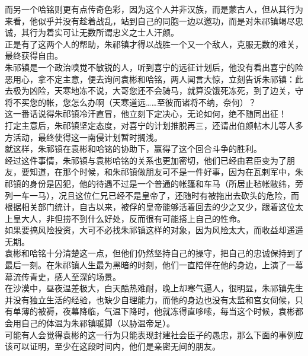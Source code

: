 \begin{multicols}{\theparacolNo}
而另一个哈铭则更有点传奇色彩，因为这个人并非汉族，而是蒙古人，但从其行为来看，他似乎并没有趁着战乱，站到自己的同胞一边以邀功，而是对朱祁镇竭尽忠诚，其行为着实可让无数所谓忠义之士人汗颜。\\

正是有了这两个人的帮助，朱祁镇才得以战胜一个又一个敌人，克服无数的难关，最终获得自由。\\

朱祁镇是一个政治嗅觉不敏锐的人，听到喜宁的远征计划后，他没有看出喜宁的险恶用心，拿不定主意，便去询问袁彬和哈铭，两人闻言大惊，立刻告诉朱祁镇：此去极为凶险，天寒地冻不说，大哥您还不会骑马，就算没饿死冻死，到了边关，守将不买您的帐，您怎么办啊（天寒道远……至彼而诸将不纳，奈何）？\\

这一番话说得朱祁镇冷汗直冒，他立刻下定决心，无论如何，绝不随同出征！\\

打定主意后，朱祁镇坚定态度，对喜宁的计划推脱再三，还请出伯颜帖木儿等人多方活动，最终使得这一南侵计划暂时搁浅。\\

就这样，朱祁镇在袁彬和哈铭的协助下，赢得了这个回合斗争的胜利。\\

经过这件事情，朱祁镇与袁彬哈铭的关系也更加密切，他们已经由君臣变为了朋友，要知道，在那个时候，和朱祁镇做朋友可不是一件好事，因为在瓦剌军中，朱祁镇的身份是囚犯，他的待遇不过是一个普通的帐篷和车马（所居止毡帐敝纬，旁列一车一马），况且这位仁兄已经不是皇帝了，还随时有被拖出去砍头的危险，而根据相关部门统计，自古以来，被俘的皇帝能够活着回去的少之又少，跟着这位太上皇大人，非但捞不到什么好处，反而很有可能搭上自己的性命。\\

如果要搞风险投资，大可不必找朱祁镇这样的对象，因为风险太大，而收益却遥遥无期。\\

袁彬和哈铭十分清楚这一点，但他们仍然坚持自己的操守，把自己的忠诚保持到了最后一刻。在朱祁镇人生最为黑暗的时刻，他们一直陪伴在他的身边，上演了一幕幕流传青史，感人至深的场景。\\

在沙漠中，昼夜温差极大，白天酷热难耐，晚上却寒气逼人，很明显，朱祁镇先生并没有独立生活的经验，也缺少自理能力，而他的身边也没有太监和宫女伺候，只有单薄的被褥，夜幕降临，气温下降时，他就冻得直哆嗦，每当这个时候，袁彬都会用自己的体温为朱祁镇暖脚（以胁温帝足）。\\

可能有人会觉得袁彬的这一行为只能表现封建社会臣子的愚忠，那么下面的事例应该可以证明，至少在这段时间内，他们是亲密无间的朋友。\\


\end{multicols}
